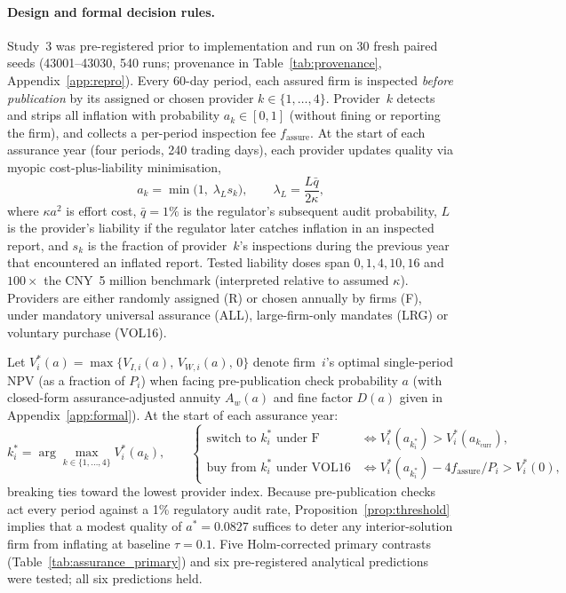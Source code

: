 \documentclass[11pt]{article}
\begin{document}
\paragraph{Design and formal decision rules.} Study~3 was pre-registered prior to implementation and run on 30 fresh paired seeds (43001--43030, 540 runs; provenance in Table~\ref{tab:provenance}, Appendix~\ref{app:repro}). Every 60-day period, each assured firm is inspected \emph{before publication} by its assigned or chosen provider $k \in \{1,\dots,4\}$. Provider~$k$ detects and strips all inflation with probability $a_k \in [0,1]$ (without fining or reporting the firm), and collects a per-period inspection fee $f_{\mathrm{assure}}$. At the start of each assurance year (four periods, 240 trading days), each provider updates quality via myopic cost-plus-liability minimisation,
\begin{equation}
a_k = \min\!\big(1,\; \lambda_L s_k\big), \qquad \lambda_L = \frac{L\bar q}{2\kappa},
\label{eq:assurer}
\end{equation}
where $\kappa a^2$ is effort cost, $\bar q = 1\%$ is the regulator's subsequent audit probability, $L$ is the provider's liability if the regulator later catches inflation in an inspected report, and $s_k$ is the fraction of provider~$k$'s inspections during the previous year that encountered an inflated report. Tested liability doses span $0, 1, 4, 10, 16$ and $100\times$ the CNY~5 million benchmark (interpreted relative to assumed $\kappa$). Providers are either randomly assigned (R) or chosen annually by firms (F), under mandatory universal assurance (ALL), large-firm-only mandates (LRG) or voluntary purchase (VOL16).

Let $V^*_i(a) = \max\{V_{I,i}(a),\, V_{W,i}(a),\, 0\}$ denote firm~$i$'s optimal single-period NPV (as a fraction of $P_i$) when facing pre-publication check probability $a$ (with closed-form assurance-adjusted annuity $A_w(a)$ and fine factor $D(a)$ given in Appendix~\ref{app:formal}). At the start of each assurance year:
\begin{equation}
k^*_i = \arg\max_{k \in \{1,\dots,4\}} V^*_i(a_k), \qquad
\begin{cases}
\text{switch to } k^*_i \text{ under F} & \iff V^*_i(a_{k^*_i}) > V^*_i(a_{k_{\mathrm{curr}}}), \\
\text{buy from } k^*_i \text{ under VOL16} & \iff V^*_i(a_{k^*_i}) - 4 f_{\mathrm{assure}}/P_i > V^*_i(0),
\end{cases}
\label{eq:assurer_choice}
\end{equation}
breaking ties toward the lowest provider index. Because pre-publication checks act every period against a 1\% regulatory audit rate, Proposition~\ref{prop:threshold} implies that a modest quality of $a^* = 0.0827$ suffices to deter any interior-solution firm from inflating at baseline $\tau = 0.1$. Five Holm-corrected primary contrasts (Table~\ref{tab:assurance_primary}) and six pre-registered analytical predictions were tested; all six predictions held.
\end{document}
